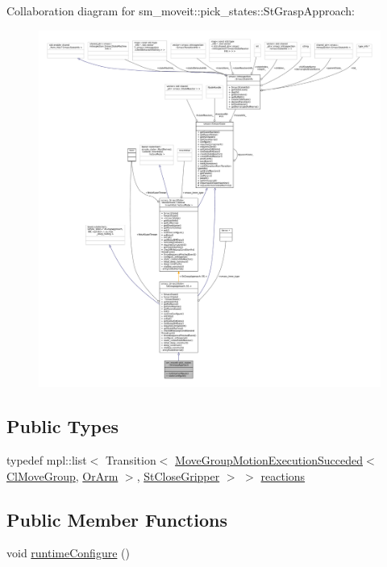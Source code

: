 Collaboration diagram for sm\+\_\+moveit\+:\+:pick\+\_\+states\+:\+:St\+Grasp\+Approach\+:
\nopagebreak
\begin{figure}[H]
\begin{center}
\leavevmode
\includegraphics[width=350pt]{structsm__moveit_1_1pick__states_1_1StGraspApproach__coll__graph}
\end{center}
\end{figure}
\subsection*{Public Types}
\begin{DoxyCompactItemize}
\item 
typedef mpl\+::list$<$ Transition$<$ \hyperlink{structsm__moveit_1_1cl__movegroup_1_1MoveGroupMotionExecutionSucceded}{Move\+Group\+Motion\+Execution\+Succeded}$<$ \hyperlink{classsm__moveit_1_1cl__movegroup_1_1ClMoveGroup}{Cl\+Move\+Group}, \hyperlink{classsm__moveit_1_1OrArm}{Or\+Arm} $>$, \hyperlink{structsm__moveit_1_1pick__states_1_1StCloseGripper}{St\+Close\+Gripper} $>$ $>$ \hyperlink{structsm__moveit_1_1pick__states_1_1StGraspApproach_a84f13b04c622425c1b838f339c756d14}{reactions}
\end{DoxyCompactItemize}
\subsection*{Public Member Functions}
\begin{DoxyCompactItemize}
\item 
void \hyperlink{structsm__moveit_1_1pick__states_1_1StGraspApproach_a2f8bdc983aeb3ba4b0d2e2f0c4e12d8d}{runtime\+Configure} ()
\end{DoxyCompactItemize}
